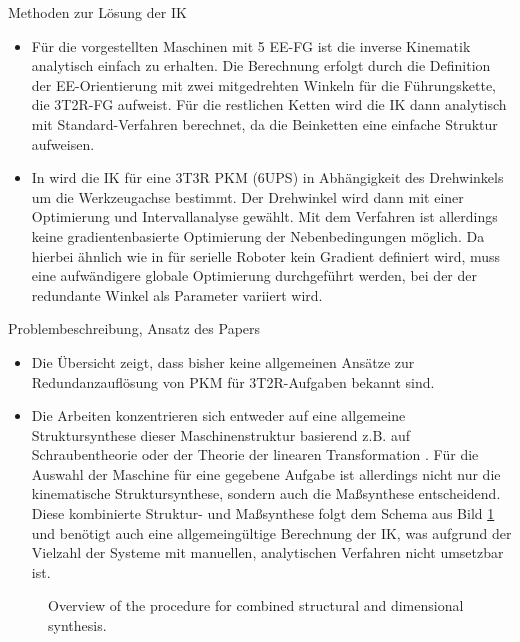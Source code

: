 \documentclass[robotics,article,submit,moreauthors,pdftex]{Definitions/mdpi}
\begin{document}
Methoden zur Lösung der IK

\begin{itemize}
	\item Für die vorgestellten Maschinen mit 5 EE-FG \cite{LiuXuYaoXu2015,WenQinZhaLam2016,ZhengGaoZha2005,GaoSunZha2004,ChengWanZha2008,AlaghebandMahMilBen2015,BaerWei2006,Tale-MasoulehSaaGosTag2010,Tale-MasoulehGos2011} ist die inverse Kinematik analytisch einfach zu erhalten. Die Berechnung erfolgt durch die Definition der EE-Orientierung mit zwei mitgedrehten Winkeln für die Führungskette, die 3T2R-FG aufweist. Für die restlichen Ketten wird die IK dann analytisch mit Standard-Verfahren berechnet, da die Beinketten eine einfache Struktur aufweisen.
	\item In \cite{MerletPerDan2000} wird die IK für eine 3T3R PKM (6UPS) in Abhängigkeit des Drehwinkels um die Werkzeugachse bestimmt. Der Drehwinkel wird dann mit einer Optimierung und Intervallanalyse gewählt. Mit dem Verfahren ist allerdings keine gradientenbasierte Optimierung der Nebenbedingungen möglich. Da hierbei ähnlich wie in \cite{ZhuQuCaoYan2013,GuoDonKe2015} für serielle Roboter kein Gradient definiert wird, muss eine aufwändigere globale Optimierung durchgeführt werden, bei der der redundante Winkel als Parameter variiert wird.
\end{itemize}

Problembeschreibung, Ansatz des Papers
\begin{itemize}
	\item Die Übersicht zeigt, dass bisher keine allgemeinen Ansätze zur Redundanzauflösung von PKM für 3T2R-Aufgaben bekannt sind.
	\item Die Arbeiten konzentrieren sich entweder auf eine allgemeine Struktursynthese dieser Maschinenstruktur basierend z.B. auf Schraubentheorie \cite{KongGos2005} oder der Theorie der linearen Transformation \cite{Gogu2006}. Für die Auswahl der Maschine für eine gegebene Aufgabe ist allerdings nicht nur die kinematische Struktursynthese, sondern auch die Maßsynthese entscheidend. Diese kombinierte Struktur- und Maßsynthese folgt dem Schema aus Bild \ref{fig:structdimsynth} und benötigt auch eine allgemeingültige Berechnung der IK, was aufgrund der Vielzahl der Systeme mit manuellen, analytischen Verfahren nicht umsetzbar ist.
\end{itemize}


\begin{figure}[tb]
	
	\caption{Overview of the procedure for combined structural and dimensional synthesis.}
	\label{fig:structdimsynth}
\end{figure} 
\end{document}

